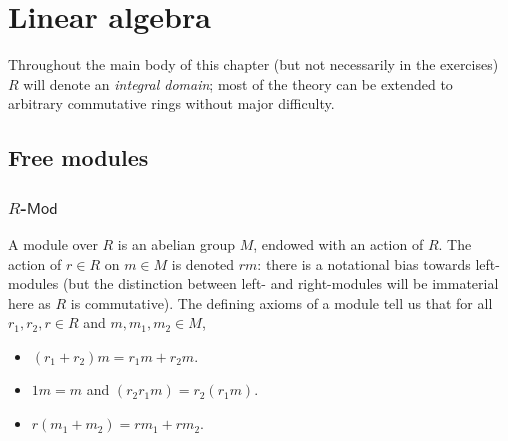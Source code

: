 \chapter{Linear algebra}
Throughout the main body of this chapter (but not necessarily in the exercises) $R$ will denote an \textit{integral domain}; most of the theory can be extended to arbitrary commutative rings without major difficulty.
\section{Free modules}
\subsection{$R$-$\mathsf{Mod}$}
A module over $R$ is an abelian group $M$, endowed with an action of $R$. The action of $r\in R$ on $m\in M$ is denoted $rm$: there is a notational bias towards left-modules (but the distinction between left- and right-modules will be immaterial here as $R$ is commutative). The defining
axioms of a module tell us that for all $r_1, r_2, r\in R$ and $m,m_1,m_2\in M$,
\begin{itemize}
\item $(r_1+r_2)m=r_1m+r_2m$.
\item $1m=m$ and $(r_2r_1m)=r_2(r_1m)$.
\item $r(m_1+m_2)=rm_1+rm_2$.
\end{itemize}
